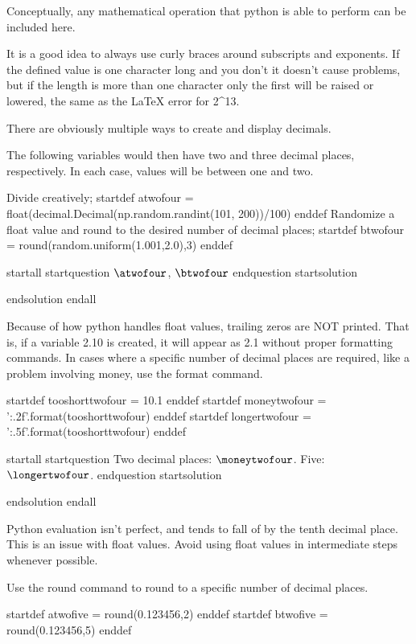 Conceptually, any mathematical operation that python is able to perform can be included here.

It is a good idea to always use curly braces around subscripts and exponents. If the defined value is one character long and you don't it doesn't cause problems, but if the length is more than one character only the first will be raised or lowered, the same as the LaTeX error for 2^13.




There are obviously multiple ways to create and display decimals.

The following variables would then have two and three decimal places, respectively. In each case, values will be between one and two.

Divide creatively;
startdef atwofour = float(decimal.Decimal(np.random.randint(101, 200))/100) enddef
Randomize a float value and round to the desired number of decimal places;
startdef btwofour = round(random.uniform(1.001,2.0),3) enddef

startall
startquestion $\atwofour$, $\btwofour$ endquestion
startsolution \item  endsolution
endall

Because of how python handles float values, trailing zeros are NOT printed. That is, if a variable 2.10 is created, it will appear as 2.1 without proper formatting commands. In cases where a specific number of decimal places are required, like a problem involving money, use the format command.

startdef tooshorttwofour = 10.1 enddef
startdef moneytwofour = '{:.2f}'.format(tooshorttwofour) enddef
startdef longertwofour = '{:.5f}'.format(tooshorttwofour) enddef

startall
startquestion Two decimal places: $\moneytwofour$. Five: $\longertwofour$. endquestion
startsolution \item  endsolution
endall




Python evaluation isn't perfect, and tends to fall of by the tenth decimal place. This is an issue with float values. Avoid using float values in intermediate steps whenever possible.

Use the round command to round to a specific number of decimal places.

startdef atwofive = round(0.123456,2) enddef
startdef btwofive = round(0.123456,5) enddef

